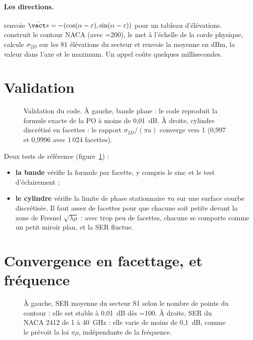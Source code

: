 \paragraph{Les directions.}  renvoie $\shat=-(\cos(\alpha-\varepsilon),\sin(\alpha-\varepsilon))$ pour un tableau d'élévations.  construit le contour NACA (avec =200), le met à l'échelle de la corde physique, calcule $\sigma_{2D}$ sur les 81 élévations du secteur et renvoie la moyenne en dBm, la valeur dans l'axe et le maximum. Un appel coûte quelques millisecondes.

\section{Validation}
\begin{figure}[htbp]
\centering

\caption{Validation du code. À gauche, bande plane : le code reproduit la formule exacte de la PO à moins de 0,01~dB. À droite, cylindre discrétisé en facettes : le rapport $\sigma_{2D}/(\pi a)$ converge vers 1 (0,997 et 0,9996 avec 1\,024 facettes).}\label{fig:validation}
\end{figure}

Deux tests de référence (figure~\ref{fig:validation}) :
\begin{itemize}
\item \textbf{la bande} vérifie la formule par facette, y compris le sinc et le test d'éclairement ;
\item \textbf{le cylindre} vérifie la limite de phase stationnaire $\pi a$ sur une surface courbe discrétisée. Il faut assez de facettes pour que chacune soit petite devant la zone de Fresnel $\sqrt{\lambda\rho}$ : avec trop peu de facettes, chacune se comporte comme un petit miroir plan, et la SER fluctue.
\end{itemize}

\section{Convergence en facettage, et fréquence}
\begin{figure}[htbp]
\centering

\caption{À gauche, SER moyenne du secteur S1 selon le nombre de points du contour : elle est stable à 0,01~dB dès =100. À droite, SER du NACA 2412 de 1 à 40~GHz : elle varie de moins de 0,1~dB, comme le prévoit la loi $\pi\rho$, indépendante de la fréquence.}\label{fig:conv-ser}
\end{figure}

